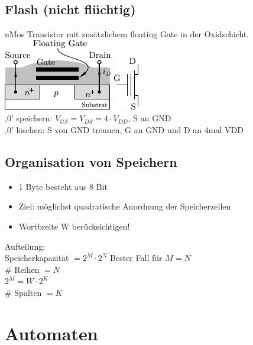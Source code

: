 \documentclass[6pt,a4paper]{scrartcl}
\begin{document}
\begin{multicols}{3}
	\subsection{Flash (nicht flüchtig)}
	nMos Transistor mit zusätzlichem floating Gate in der Oxidschicht.\\
	\includegraphics{./img/ds/flash.pdf} \qquad \includegraphics{./img/ds/flashsymbol.pdf}\\
	‚0’ speichern: $V_{GS} = V_{DS} = 4 \cdot V_{DD}$, S an GND\\
	‚0’ löschen: S von GND trennen, G an GND und D an 4mal VDD\\
 

\subsection{Organisation von Speichern} 

\begin{itemize} \itemsep0pt
	\item 1 Byte besteht aus 8 Bit
	\item Ziel: möglichst quadratische Anordnung der Speicherzellen
	\item Wortbreite W berücksichtigen!	
\end{itemize}
Aufteilung:\\
Speicherkapazität $= 2^M \cdot 2^N$ Bester Fall für $M=N$\\ 
\# Reihen $= N$\\
$2^M = W \cdot 2^K$\\
\# Spalten $= K$\\









\section{Automaten} %


\end{multicols}
\end{document}
